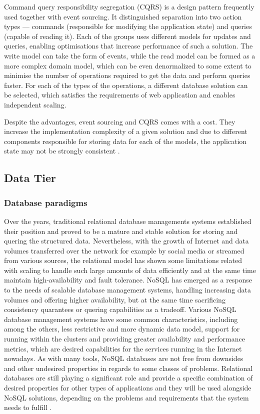 Command query responsibility segregation (CQRS) is a design pattern frequently used together with event sourcing. It distinguished separation into two action types --- commands (responsible for modifying the application state) and queries (capable of reading it). Each of the groups uses different models for updates and queries, enabling optimisations that increase performance of such a solution. The write model can take the form of events, while the read model can be formed as a more complex domain model, which can be even denormalized to some extent to minimise the number of operations required to get the data and perform queries faster. For each of the types of the operations, a different database solution can be selected, which satisfies the requirements of web application and enables independent scaling. 

Despite the advantages, event sourcing and CQRS comes with a cost. They increase the implementation complexity of a given solution and due to different components responsible for storing data for each of the models, the application state may not be strongly consistent \cite{MicroservicesArchitecture}.

\subsection{Data Tier}

\subsubsection{Database paradigms} \label{chapter:database-paradigms}

Over the years, traditional relational database managements systems \cite{RDBMS} established their position and proved to be a mature and stable solution for storing and quering the structured data. Nevertheless, with the growth of Internet and data volumes transferred over the network for example by social media or streamed from various sources, the relational model has shown some limitations related with scaling to handle such large amounts of data efficiently and at the same time maintain high-availability and fault tolerance. NoSQL \cite{FowlerNoSQLDefinition} has emerged as a response to the needs of scalable database management systems, handling increasing data volumes and offering higher availability, but at the same time sacrificing consistency quarantees or quering capabilities as a tradeoff. Various NoSQL database management systems have some common characteristics, including among the others, less restrictive and more dynamic data model, support for running within the clusters and providing greater availability and performance metrics, which are desired capabilities for the services running in the Internet nowadays. As with many tools, NoSQL databases are not free from downsides and other undesired properties in regards to some classes of problems. Relational databases are still playing a significant role and provide a specific combination of desired properties for other types of applications and they will be used alongside NoSQL solutions, depending on the problems and requirements that the system needs to fulfill \cite{FowlerNoSQLGOTO}.

